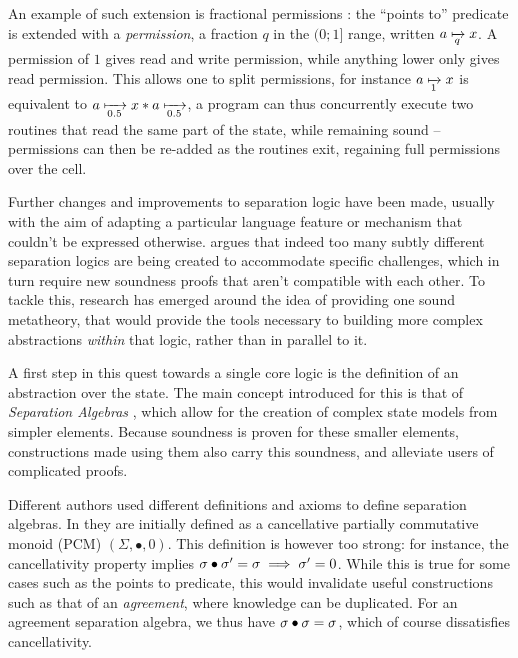 An example of such extension is fractional permissions \cite{fracpermissions, fracpermissions2}: the ``points to'' predicate is extended with a \emph{permission}, a fraction $q$ in the $(0;1]$ range, written $a \mapstoq{q} x$. A permission of $1$ gives read and write permission, while anything lower only gives read permission. This allows one to split permissions, for instance $a \mapstoq{1} x$ is equivalent to $a\mapstoq{0.5}x * a\mapstoq{0.5}$, a program can thus concurrently execute two routines that read the same part of the state, while remaining sound -- permissions can then be re-added as the routines exit, regaining full permissions over the cell.

Further changes and improvements to separation logic have been made, usually with the aim of adapting a particular language feature or mechanism that couldn't be expressed otherwise.  argues that indeed too many subtly different separation logics are being created to accommodate specific challenges, which in turn require new soundness proofs that aren't compatible with each other. To tackle this, research has emerged around the idea of providing one sound metatheory, that would provide the tools necessary to building more complex abstractions \emph{within} that logic, rather than in parallel to it.

A first step in this quest towards a single core logic is the definition of an abstraction over the state. The main concept introduced for this is that of \emph{Separation Algebras} \cite{abstractseplogic, sepalgebra}, which allow for the creation of complex state models from simpler elements. Because soundness is proven for these smaller elements, constructions made using them also carry this soundness, and alleviate users of complicated proofs.

Different authors used different definitions and axioms to define separation algebras. In \cite{abstractseplogic} they are initially defined as a cancellative partially commutative monoid (PCM) $(\Sigma, \bullet, 0)$. This definition is however too strong: for instance, the cancellativity property implies $\sigma\bullet\sigma'=\sigma \implies \sigma'=0$. While this is true for some cases such as the points to predicate, this would invalidate useful constructions such as that of an \emph{agreement}, where knowledge can be duplicated. For an agreement separation algebra, we thus have $\sigma \bullet \sigma = \sigma$, which of course dissatisfies cancellativity.

